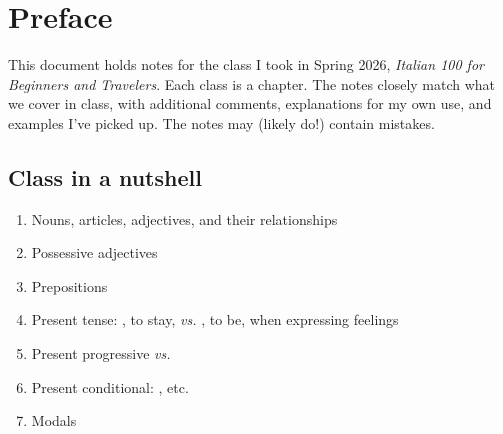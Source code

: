 
\chapter{Preface}
This document holds notes for the class I took in Spring 2026, \textit{Italian 100 for 
Beginners and Travelers}. Each class is a chapter. The notes closely match what we cover in 
class, with additional comments, explanations for my own use, and examples I've picked up. 
The notes may (likely do!) contain mistakes.

\section{Class in a nutshell}
\begin{enumerate}
  \item Nouns, articles, adjectives, and their relationships
  \item Possessive adjectives
  \item Prepositions
  \item Present tense: , to stay, \textit{vs.} , to be, when expressing feelings
  \item Present progressive  \textit{vs.} 
  \item Present conditional: , etc.
  \item Modals
\end{enumerate}
